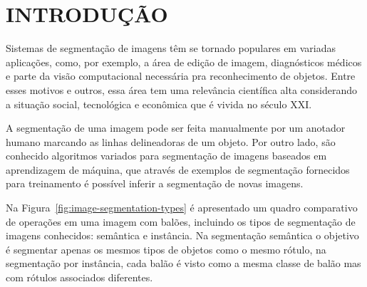 \chapter{INTRODUÇÃO}\label{cap:introducao}

Sistemas de segmentação de imagens têm se tornado populares em
variadas aplicações, como, por exemplo, a área de edição de imagem,
diagnósticos médicos e parte da visão computacional necessária pra
reconhecimento de objetos. Entre esses motivos e outros, essa área tem
uma relevância científica alta considerando a situação social,
tecnológica e econômica que é vivida no século XXI.\@

A segmentação de uma imagem pode ser feita manualmente por um anotador
humano marcando as linhas delineadoras de um objeto. Por outro lado,
são conhecido algoritmos variados para segmentação de imagens baseados
em aprendizagem de máquina, que através de exemplos de segmentação
fornecidos para treinamento é possível inferir a segmentação de novas imagens.

Na Figura~\ref{fig:image-segmentation-types} é apresentado um quadro
comparativo de operações em uma imagem com balões, incluindo os tipos
de segmentação de imagens conhecidos: semântica e instância. Na
segmentação semântica o objetivo é segmentar apenas os mesmos tipos de
objetos como o mesmo rótulo, na segmentação por instância, cada balão
é visto como a mesma classe de balão mas com rótulos associados diferentes.

\begin{figure}[h!]
        \captionsetup{width=16cm}
		\centering
\end{figure}


